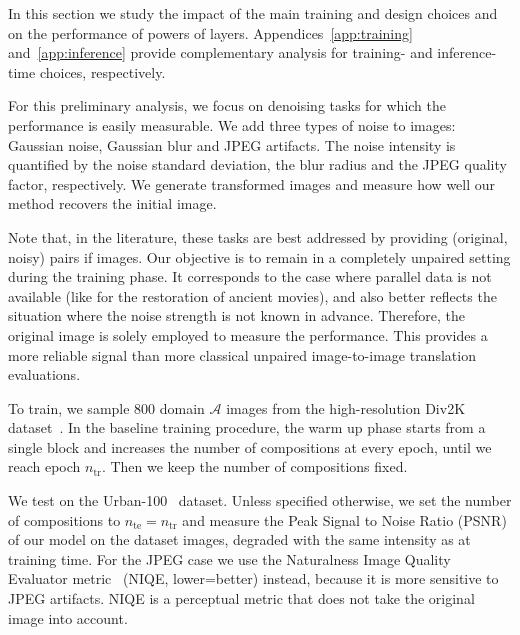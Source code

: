 \documentclass[a4paper,10pt]{extarticle}
\makeatletter
\def\Ac{\mathcal A}
\renewcommand{\paragraph}{\@startsection{paragraph}{4}{\z@}{0em}{-0.5em}{\normalfont\normalsize\bfseries}}
\makeatother
\begin{document}
\newcommand{\stdminus}[1]{ \scalebox{0.8}{$\pm #1$}}

In this section we study the impact of the main training and design choices and on the performance of powers of layers. 
Appendices~\ref{app:training} and~\ref{app:inference} provide complementary analysis for training- and inference-time choices, respectively. 

For this preliminary analysis, we focus on denoising tasks for which the performance is easily measurable. We add three types of noise to images: 
Gaussian noise, Gaussian blur and JPEG artifacts. 
The noise intensity is quantified by the noise standard deviation, the blur radius and the JPEG quality factor, respectively. 
We generate transformed images and measure how well our method recovers the initial image. 


Note that, in the literature, these tasks are best addressed by providing  (original, noisy) pairs if images. 
Our objective is to remain in a completely unpaired setting during the training phase. 
It corresponds to the case where parallel data is not available (like for the restoration of ancient movies), and also better reflects the situation where the noise strength is not known in advance. 
Therefore, the original image is solely employed to measure the performance.
This provides a more reliable signal than more classical unpaired image-to-image translation evaluations. 
\newcommand{\maxcomp}{n_\mathrm{tr}}
\newcommand{\maxcomptest}{n_\mathrm{te}}


\paragraph{Experimental protocol.}
To train, we sample 800 domain $\Ac$ images from the high-resolution Div2K dataset~\cite{Agustsson_2017_CVPR_Workshops}. 
In the baseline training procedure, the warm up phase starts from a single block and increases the number of compositions at every epoch, until we reach epoch $\maxcomp$. Then we keep the number of compositions fixed. 

We test on the Urban-100~\cite{Huang2015Urban100} dataset.
Unless specified otherwise, we set the number of compositions to $\maxcomptest = \maxcomp$ and
measure the Peak Signal to Noise Ratio (PSNR) of our model on the dataset images, degraded with the same intensity as at training time.
For the JPEG case we use the  Naturalness Image Quality Evaluator metric~\cite{Mittal2013NIQE} (NIQE, lower=better) instead, because it is more sensitive to JPEG artifacts.
NIQE is a perceptual metric that does not take the original image into account. 
\end{document}
